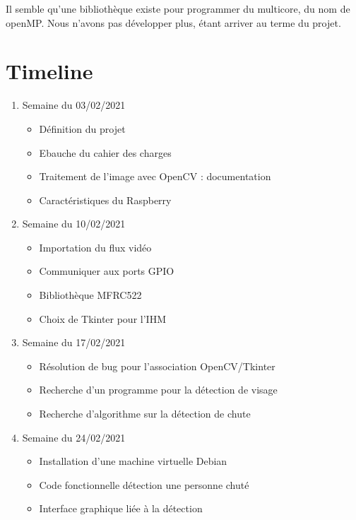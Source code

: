 \documentclass[a4paper]{report}
\begin{document}
    Il semble qu'une bibliothèque existe pour programmer du multicore, du nom de openMP. 
    Nous n'avons pas développer plus, étant arriver au terme du projet.
    
        \section{Timeline}
    
    \begin{enumerate}
        \item Semaine du 03/02/2021
            \begin{itemize}
                \item Définition du projet
                \item Ebauche du cahier des charges
                \item Traitement de l'image avec OpenCV : documentation
                \item Caractéristiques du Raspberry
            \end{itemize}
        \item Semaine du 10/02/2021
            \begin{itemize}
                \item Importation du flux vidéo
                \item Communiquer aux ports GPIO 
                \item Bibliothèque MFRC522 
                \item Choix de Tkinter pour l'IHM
            \end{itemize}
        \item Semaine du 17/02/2021
            \begin{itemize}
                \item Résolution de bug pour l'association OpenCV/Tkinter 
                \item Recherche d'un programme pour la détection de visage
                \item Recherche d'algorithme sur la détection de chute
            \end{itemize}
        \item Semaine du 24/02/2021
            \begin{itemize}
                \item Installation d'une machine virtuelle Debian
                \item Code fonctionnelle détection une personne chuté 
                \item Interface graphique liée à la détection

\end{itemize}
\end{enumerate}
\end{document}
